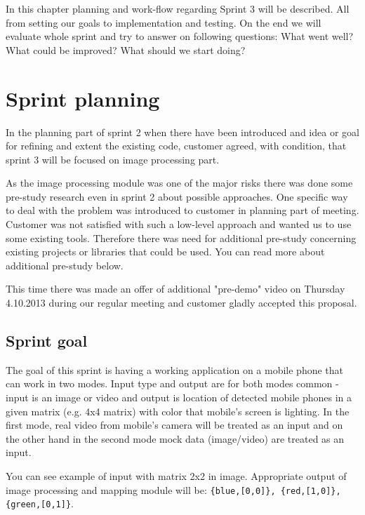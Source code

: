 In this chapter planning and work-flow regarding Sprint 3 will be described. 
All from setting our goals to implementation and testing. On the end we will evaluate whole sprint and try to answer on following questions: What went well? What could be improved? What should we start doing?  

\section{Sprint planning}
In the planning part of sprint 2 when there have been introduced and idea or goal for refining and extent the existing code, customer agreed, with condition, that sprint 3 will be focused on image processing part.

As the image processing module was one of the major risks there was done some pre-study research even in sprint 2 about possible approaches.
One specific way to deal with the problem was introduced to customer in planning part of meeting.
Customer was not satisfied with such a low-level approach and wanted us to use some existing tools.
Therefore there was need for additional pre-study concerning existing projects or libraries that could be used.
You can read more about additional pre-study below.

This time there was made an offer of additional "pre-demo" video on Thursday 4.10.2013 during our regular meeting and customer gladly accepted this proposal.

\subsection{Sprint goal}
The goal of this sprint is having a working application on a mobile phone that can work in two modes.  
Input type and output are for both modes common - input is an image or video and output is location of detected mobile phones in a given matrix (e.g. 4x4 matrix) with color that mobile's screen is lighting.
In the first mode, real video from mobile's camera will be treated as an input and on the other hand in the second mode mock data (image/video) are treated as an input.

You can see example of input with matrix 2x2 in image. Appropriate output of image processing and mapping module will be: \texttt{\{blue,[0,0]\}, \{red,[1,0]\}, \{green,[0,1]\}}.

